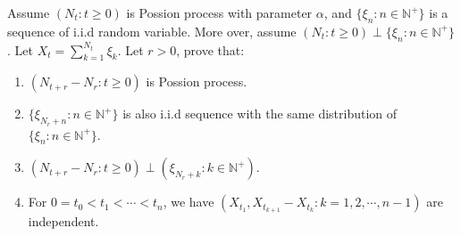 \documentclass[../main]{subfiles}
\begin{document}
\begin{problem}\label{pro:1}
  Assume \((N_t:t \geq 0)\) is Possion process with parameter \(\alpha\), and \(\{\xi_n:n \in  \mathbb{N}^+\}\) is a sequence of i.i.d random variable.
  More over, assume \((N_t:t \geq 0) \perp \{\xi_n:n \in \mathbb{N}^+\}\).
  Let \(X_t=\sum_{k=1}^{N_t} \xi_k\).
  Let \(r>0\), prove that:
  \begin{enumerate}
    \item \((N_{t+r}-N_r:t \geq 0)\) is Possion process.
    \item \label{it:1.2}\(\{\xi_{N_r+n}:n \in \mathbb{N}^+\}\) is also i.i.d sequence with the same distribution of \(\{\xi_n:n \in \mathbb{N}^+\}\).
    \item \((N_{t + r}-N_r:t \geq 0)\perp (\xi_{N_r + k}:k \in \mathbb{N}^+)\).
    \item For \(0=t_0<t_1<\cdots<t_n\), we have \((X_{t_1},X_{t_{k+1}}-X_{t_k}:k=1,2,\cdots,n-1)\) are independent.
  \end{enumerate}
\end{problem}
\end{document}
